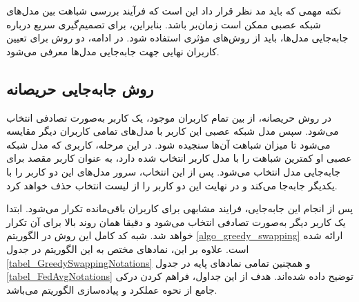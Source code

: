 نکته مهمی که باید مد نظر قرار داد این است که فرآیند بررسی شباهت بین مدل‌های شبکه عصبی ممکن است زمان‌بر باشد. بنابراین، برای تصمیم‌گیری سریع درباره جابه‌جایی مدل‌ها، باید از روش‌های مؤثری استفاده شود. در ادامه، دو روش برای تعیین کاربران نهایی جهت جابه‌جایی مدل‌ها معرفی می‌شود.


\subsection{
	روش جابه‌جایی حریصانه%
}
در روش حریصانه، از بین تمام کاربران موجود، یک کاربر به‌صورت تصادفی انتخاب می‌شود. سپس مدل شبکه عصبی این کاربر با مدل‌های تمامی کاربران دیگر مقایسه می‌شود تا میزان شباهت آن‌ها سنجیده شود. در این مرحله، کاربری که مدل شبکه عصبی او کمترین شباهت را با مدل کاربر انتخاب‌ شده دارد، به عنوان کاربر مقصد برای جابه‌جایی مدل انتخاب می‌شود. پس از این انتخاب، سرور مدل‌های این دو کاربر را با یکدیگر جابه‌جا می‌کند و در نهایت این دو کاربر را از لیست انتخاب حذف خواهد کرد.

پس از انجام این جابه‌جایی، فرایند مشابهی برای کاربران باقی‌مانده تکرار می‌شود. ابتدا یک کاربر دیگر به‌صورت تصادفی انتخاب می‌شود و دقیقا همان روند بالا برای آن تکرار خواهد شد.
شبه کد کامل این روش در الگوریتم
\ref{algo_greedy_swapping}
ارائه شده است. علاوه بر این، نمادهای مختص به این الگوریتم در جدول
\ref{tabel_GreedySwappingNotations}
و همچنین تمامی نمادهای پایه در جدول
\ref{tabel_FedAvgNotations}
توضیح داده شده‌اند.
هدف از این جداول، فراهم کردن درکی جامع از نحوه عملکرد و پیاده‌سازی الگوریتم می‌باشد.


\begin{LTR}
	\begin{algorithm}[t]
		\begin{RTL}
			\caption{%
				جابه‌جایی حریصانه
			}
			\label{algo_greedy_swapping}
		\end{RTL}
		
		\begin{latin}
		\end{latin}
	\end{algorithm}
\end{LTR}


